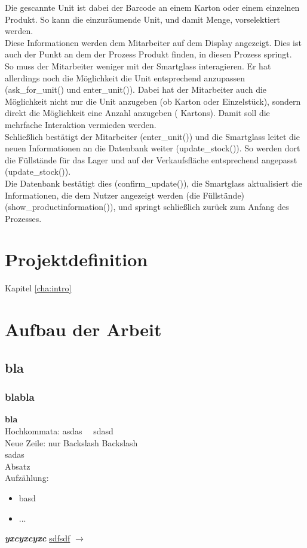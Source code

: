 Die gescannte Unit ist dabei der Barcode an einem Karton oder einem einzelnen Produkt. So kann die einzuräumende Unit, und damit Menge, vorselektiert werden. 
\\
Diese Informationen werden dem Mitarbeiter auf dem Display angezeigt. Dies ist auch der Punkt an dem der Prozess \glqq Produkt finden\grqq , in diesen Prozess springt.
\\
So muss der Mitarbeiter weniger mit der Smartglass interagieren. Er hat allerdings noch die Möglichkeit die Unit entsprechend anzupassen (ask\_for\_unit() und enter\_unit()). Dabei hat der Mitarbeiter auch die Möglichkeit nicht nur die Unit anzugeben (ob Karton oder Einzelstück), sondern direkt die Möglichkeit eine Anzahl anzugeben ( Kartons). Damit soll die mehrfache Interaktion vermieden werden. 
\\
Schließlich bestätigt der Mitarbeiter (enter\_unit()) und die Smartglass leitet die neuen Informationen an die Datenbank weiter (update\_stock()). So werden dort die Füllstände für das Lager und auf der Verkaufsfläche entsprechend angepasst (update\_stock()).
\\
Die Datenbank bestätigt dies (confirm\_update()), die Smartglass aktualisiert die Informationen, die dem Nutzer angezeigt werden (die Füllstände) (show\_productinformation()), und springt schließlich zurück zum Anfang des Prozesses. 
\\
\section{Projektdefinition}
Kapitel \ref{cha:intro}

\section{Aufbau der Arbeit}
\subsection{bla}
\subsubsection{blabla}
\textbf{bla}\\
Hochkommata: \glqq asdas\grqq~~ sdasd\\

Neue Zeile: nur Backslash Backslash\\
sadas\\

Absatz\\

Aufzählung:
\begin{itemize}
	\item basd
	\item ...
\end{itemize}

\textit{\textbf{yxcyxcyxc}}
\underline{sdfsdf}
$\rightarrow$





